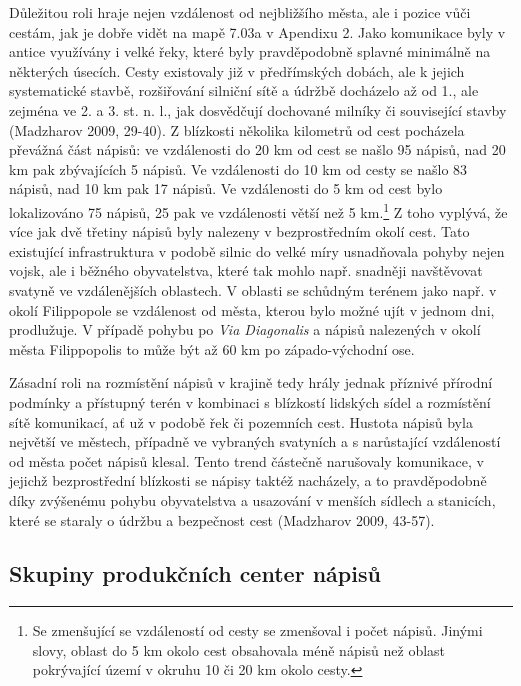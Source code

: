 Důležitou roli hraje nejen vzdálenost od nejbližšího města, ale i pozice vůči cestám, jak je dobře vidět na mapě 7.03a v Apendixu 2. Jako komunikace byly v antice využívány i velké řeky, které byly pravděpodobně splavné minimálně na některých úsecích. Cesty existovaly již v předřímských dobách, ale k jejich systematické stavbě, rozšiřování silniční sítě a údržbě docházelo až od 1., ale zejména ve 2. a 3. st. n. l., jak dosvědčují dochované milníky či související stavby (Madzharov 2009, 29-40). Z blízkosti několika kilometrů od cest pocházela převážná část nápisů: ve vzdálenosti do 20 km od cest se našlo 95  nápisů, nad 20 km pak zbývajících 5  nápisů. Ve vzdálenosti do 10 km od cesty se našlo 83  nápisů, nad 10 km pak 17  nápisů. Ve vzdálenosti do 5 km od cest bylo lokalizováno 75  nápisů, 25  pak ve vzdálenosti větší než 5 km.\footnote{Se zmenšující se vzdáleností od cesty se zmenšoval i počet nápisů. Jinými slovy, oblast do 5 km okolo cest obsahovala méně nápisů než oblast pokrývající území v okruhu 10 či 20 km okolo cesty.} Z toho vyplývá, že více jak dvě třetiny nápisů byly nalezeny v bezprostředním okolí cest. Tato existující infrastruktura v podobě silnic do velké míry usnadňovala pohyby nejen vojsk, ale i běžného obyvatelstva, které tak mohlo např. snadněji navštěvovat svatyně ve vzdálenějších oblastech. V oblasti se schůdným terénem jako např. v okolí Filippopole se vzdálenost od města, kterou bylo možné ujít v jednom dni, prodlužuje. V případě pohybu po {\em Via Diagonalis} a nápisů nalezených v okolí města Filippopolis to může být až 60 km po západo-východní ose.

Zásadní roli na rozmístění nápisů v krajině tedy hrály jednak příznivé přírodní podmínky a přístupný terén v kombinaci s blízkostí lidských sídel a rozmístění sítě komunikací, ať už v podobě řek či pozemních cest. Hustota nápisů byla největší ve městech, případně ve vybraných svatyních a s narůstající vzdáleností od města počet nápisů klesal. Tento trend částečně narušovaly komunikace, v jejichž bezprostřední blízkosti se nápisy taktéž nacházely, a to pravděpodobně díky zvýšenému pohybu obyvatelstva a usazování v menších sídlech a stanicích, které se staraly o údržbu a bezpečnost cest (Madzharov 2009, 43-57).

\subsection[skupiny-produkčních-center-nápisů]{Skupiny produkčních center nápisů}

